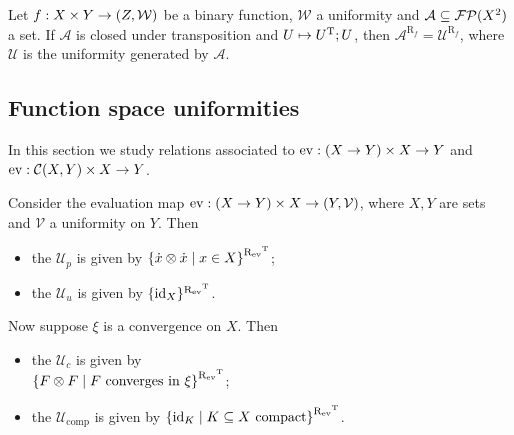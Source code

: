 \begin{lemma}
Let $f: X\times Y\to \sSet{Z, \mathcal{W}}$ be a binary function, $\mathcal{W}$ a uniformity and $\mathcal{A}\subseteq \operatorname{\mathcal{FP}}(X^2)$ a set. If $\mathcal{A}$ is closed under transposition and $U\mapsto U^{\mathrm{T}};U$, then $\mathcal{A}^{\mathrm{R}_{f}} = \mathcal{U}^{\mathrm{R}_{f}}$, where $\mathcal{U}$ is the uniformity generated by $\mathcal{A}$.
\end{lemma}

\subsection{Function space uniformities}
In this section we study relations associated to $\operatorname{ev}: (X\to Y) \times X \to Y$ and $\operatorname{ev}: \operatorname{\mathcal{C}}(X, Y) \times X \to Y$.

\begin{definition}
Consider the evaluation map $\evalMap: (X\to Y)\times X \to \sSet{Y,\mathcal{V}}$, where $X, Y$ are sets and $\mathcal{V}$ a uniformity on $Y$. Then
\begin{itemize}
\item the  $\mathcal{U}_p$ is given by $\setbuilder{\pfilter{x}\otimes\pfilter{x}}{x\in X}^{\uRelEv^\transp}$;
\item the  $\mathcal{U}_u$ is given by $\{\operatorname{id}_X\}^{\mathrel{\mathrm{R}_{\operatorname{ev}}}^{\mathrm{T}}}$.
\end{itemize}
Now suppose $\xi$ is a convergence on $X$. Then
\begin{itemize}
\item the  $\mathcal{U}_c$ is given by \\ $\setbuilder{F\otimes F}{\text{$F$ converges in $\xi$}}^{\uRelEv^\transp}$;
\item the  $\mathcal{U}_\text{comp}$ is given by $\setbuilder{\id_K}{\text{$K\subseteq X$ compact}}^{\uRelEv^\transp}$.
\end{itemize}
\end{definition}


